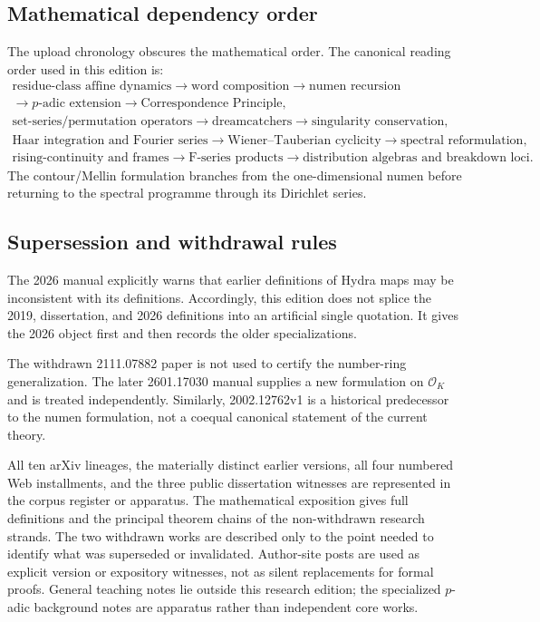 \subsection{Mathematical dependency order}

The upload chronology obscures the mathematical order.  The canonical
reading order used in this edition is:
\[
\begin{gathered}
\text{residue-class affine dynamics}\longrightarrow
\text{word composition}\longrightarrow\text{numen recursion}\\
\longrightarrow\text{$p$-adic extension}\longrightarrow
\text{Correspondence Principle},\\[3pt]
\text{set-series/permutation operators}\longrightarrow
\text{dreamcatchers}\longrightarrow
\text{singularity conservation},\\[3pt]
\text{Haar integration and Fourier series}\longrightarrow
\text{Wiener--Tauberian cyclicity}\longrightarrow
\text{spectral reformulation},\\[3pt]
\text{rising-continuity and frames}\longrightarrow
\text{F-series products}\longrightarrow
\text{distribution algebras and breakdown loci}.
\end{gathered}
\]
The contour/Mellin formulation branches from the one-dimensional numen before
returning to the spectral programme through its Dirichlet series.

\subsection{Supersession and withdrawal rules}

The 2026 manual explicitly warns that earlier definitions of Hydra maps may
be inconsistent with its definitions.  Accordingly, this edition does not
splice the 2019, dissertation, and 2026 definitions into an artificial single
quotation.  It gives the 2026 object first and then records the older
specializations.

The withdrawn 2111.07882 paper is not used to certify the number-ring
generalization.  The later 2601.17030 manual supplies a new formulation on
$\mathcal O_K$ and is treated independently.  Similarly, 2002.12762v1 is a
historical predecessor to the numen formulation, not a coequal canonical
statement of the current theory.

\begin{status}
All ten arXiv lineages, the materially distinct earlier versions, all four
numbered Web installments, and the three public dissertation witnesses are
represented in the corpus register or apparatus.  The mathematical
exposition gives full definitions and the principal theorem chains of the
non-withdrawn research strands.  The two withdrawn works are described only
to the point needed to identify what was superseded or invalidated.
Author-site posts are used as explicit version or expository witnesses, not
as silent replacements for formal proofs.  General teaching notes lie
outside this research edition; the specialized $p$-adic background notes are
apparatus rather than independent core works.
\end{status}
